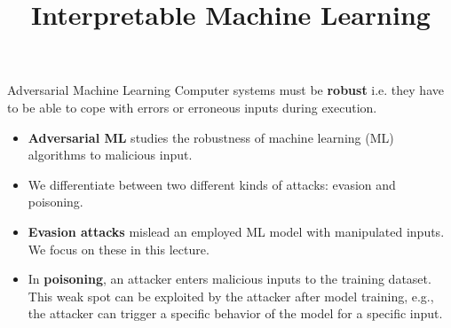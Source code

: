 \documentclass[11pt,compress,t,notes=noshow, xcolor=table]{beamer}
\title{Interpretable Machine Learning}
\institute{\href{https://compstat-lmu.github.io/lecture_i2ml/}{compstat-lmu.github.io/lecture\_i2ml}}
\date{}
\begin{document}
\newcommand{\vertiii}[1]{{\left\vert\kern-0.25ex\left\vert\kern-0.25ex\left\vert #1 
    \right\vert\kern-0.25ex\right\vert\kern-0.25ex\right\vert}}








\begin{vbframe}{Adversarial Machine Learning}
Computer systems must be \textbf{robust} i.e. they have to be able to cope with errors or erroneous inputs during execution.
\begin{itemize}
\item \textbf{Adversarial ML} studies the robustness of machine learning (ML) algorithms to malicious input.
\item We differentiate between two different kinds of attacks: evasion and poisoning.
\item \textbf{Evasion attacks} mislead an employed ML model with manipulated inputs. We focus on these in this lecture.
\item In \textbf{poisoning}, an attacker enters malicious inputs to the training dataset. This weak spot can be exploited by the attacker after model training, e.g., the attacker can trigger a specific behavior of the model for a specific input. 
\end{itemize}
\end{vbframe}
\end{document}
